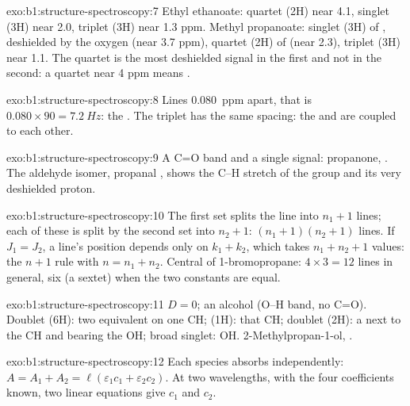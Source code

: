 \begin{solution}{exo:b1:structure-spectroscopy:7}
Ethyl ethanoate: quartet (2H) near 4.1, singlet (3H) near 2.0, triplet
(3H) near 1.3 ppm. Methyl propanoate: singlet (3H) of , deshielded
by the oxygen (near 3.7 ppm), quartet (2H) of  (near 2.3), triplet
(3H) near 1.1. The quartet is the most deshielded signal in the first and
not in the second: a quartet near 4 ppm means .
\end{solution}

\begin{solution}{exo:b1:structure-spectroscopy:8}
Lines \qty{0.080}{ppm} apart, that is $0.080 \times 90 = \qty{7.2}{Hz}$:
the . The triplet has the same spacing: the  and
 are coupled to each other.
\end{solution}

\begin{solution}{exo:b1:structure-spectroscopy:9}
A C=O band and a single signal: propanone, . The aldehyde
isomer, propanal , shows the C--H stretch of the
 group and its very deshielded proton.
\end{solution}

\begin{solution}{exo:b1:structure-spectroscopy:10}
The first set splits the line into $n_1 + 1$ lines; each of these is split
by the second set into $n_2 + 1$: $(n_1 + 1)(n_2 + 1)$ lines. If $J_1 =
J_2$, a line's position depends only on $k_1 + k_2$, which takes $n_1 + n_2 +
1$ values: the $n + 1$ rule with $n = n_1 + n_2$. Central  of
1-bromopropane: $4 \times 3 = 12$ lines in general, six (a sextet) when the
two constants are equal.
\end{solution}

\begin{solution}{exo:b1:structure-spectroscopy:11}
$D = 0$; an alcohol (O--H band, no C=O). Doublet (6H): two equivalent
 on one CH;  (1H): that CH; doublet (2H): a 
next to the CH and bearing the OH; broad singlet: OH.
2-Methylpropan-1-ol, .
\end{solution}

\begin{solution}{exo:b1:structure-spectroscopy:12}
Each species absorbs independently: $A = A_1 + A_2 = \ell(\varepsilon_1c_1
+ \varepsilon_2c_2)$. At two wavelengths, with the four coefficients known,
two linear equations give $c_1$ and $c_2$.
\end{solution}

